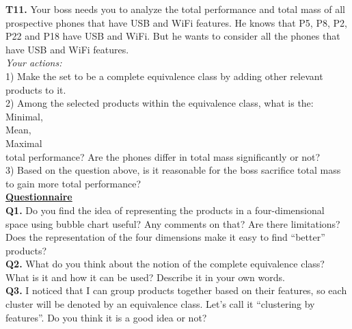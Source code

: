 \documentclass{acm_proc_article-sp}
\begin{document}
\textbf{T11.} Your boss needs you to analyze the total performance and total mass of all prospective phones that have USB and WiFi features. He knows that P5, P8, P2, P22 and P18 have USB and WiFi. But he wants to consider all the phones that have USB and WiFi features.\\
\textit{Your actions:}\\
1) Make the set to be a complete equivalence class by adding other relevant products to it.\\
2) Among the selected products within the equivalence class, what is the:\\
	Minimal,\\
	Mean,\\
	Maximal\\
total performance? Are the phones differ in total mass significantly or not?\\
3) Based on the question above, is it reasonable for the boss sacrifice total mass to gain more total performance?\\

\underline{ \textbf{Questionnaire}}\\

\textbf{Q1.} Do you find the idea of representing the products in a four-dimensional space using bubble chart useful? Any comments on that? Are there limitations? Does the representation of the four dimensions make it easy to find “better” products?\\
\textbf{Q2.} What do you think about the notion of the complete equivalence class? What is it and how it can be used? Describe it in your own words.\\
\textbf{Q3.} I noticed that I can group products together based on their features, so each cluster will be denoted by an equivalence class. Let’s call it “clustering by features”. Do you think it is a good idea or not?\\



\balancecolumns
\end{document}
